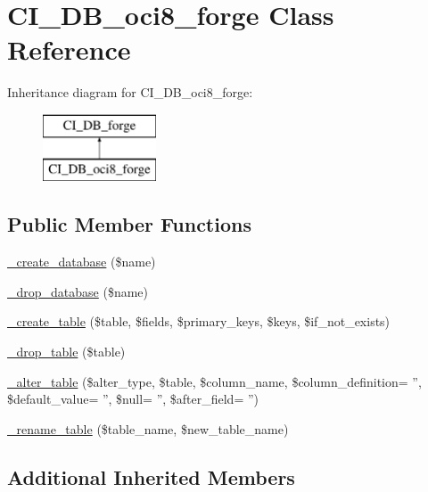 \hypertarget{class_c_i___d_b__oci8__forge}{\section{C\-I\-\_\-\-D\-B\-\_\-oci8\-\_\-forge Class Reference}
\label{class_c_i___d_b__oci8__forge}
}
Inheritance diagram for C\-I\-\_\-\-D\-B\-\_\-oci8\-\_\-forge\-:\begin{figure}[H]
\begin{center}
\leavevmode
\includegraphics[height=2.000000cm]{class_c_i___d_b__oci8__forge}
\end{center}
\end{figure}
\subsection*{Public Member Functions}
\begin{DoxyCompactItemize}
\item 
\hyperlink{class_c_i___d_b__oci8__forge_ac70184ae4a86e97f324daa1901b78777}{\-\_\-create\-\_\-database} (\$name)
\item 
\hyperlink{class_c_i___d_b__oci8__forge_a6e04d0af5e8e1e1f93f42d63f0744bfd}{\-\_\-drop\-\_\-database} (\$name)
\item 
\hyperlink{class_c_i___d_b__oci8__forge_a99d4c17257f468337344690dd590582b}{\-\_\-create\-\_\-table} (\$table, \$fields, \$primary\-\_\-keys, \$keys, \$if\-\_\-not\-\_\-exists)
\item 
\hyperlink{class_c_i___d_b__oci8__forge_a147efb0d859b7cf4148ff75642515231}{\-\_\-drop\-\_\-table} (\$table)
\item 
\hyperlink{class_c_i___d_b__oci8__forge_a34fc29f48662e18f6a4f3185a8ea206c}{\-\_\-alter\-\_\-table} (\$alter\-\_\-type, \$table, \$column\-\_\-name, \$column\-\_\-definition= '', \$default\-\_\-value= '', \$null= '', \$after\-\_\-field= '')
\item 
\hyperlink{class_c_i___d_b__oci8__forge_aec593ba62c6ff875cafeac16b1c54ae6}{\-\_\-rename\-\_\-table} (\$table\-\_\-name, \$new\-\_\-table\-\_\-name)
\end{DoxyCompactItemize}
\subsection*{Additional Inherited Members}


